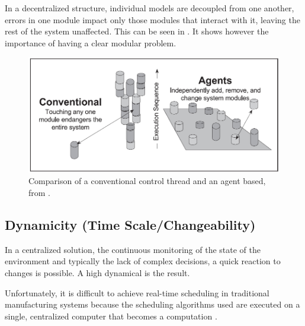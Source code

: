 In a decentralized structure, individual models are decoupled from one another, errors in one module impact only those modules that interact with it, leaving the rest of the system unaffected. This can be seen in . It shows however the importance of having a clear modular problem. 


\begin{figure}[h]
\centering
\includegraphics[width=0.7\linewidth]{img/modularity+decentral-changeability}
\caption{Comparison of a conventional control thread and an agent based, from \citep{parunak1999industrial}.}
\label{fig:modularitydecentral-changeability}
\end{figure}



\subsection{Dynamicity (Time Scale/Changeability)}
In a centralized solution, the continuous monitoring of the state of the environment and typically the lack of complex decisions, a quick reaction to changes is possible. A high dynamical is the result. 

Unfortunately, it is difficult to achieve real-time scheduling in traditional manufacturing systems because the scheduling algorithms used are executed on a single, centralized computer that becomes a computation \citep{duffie1994real}.
